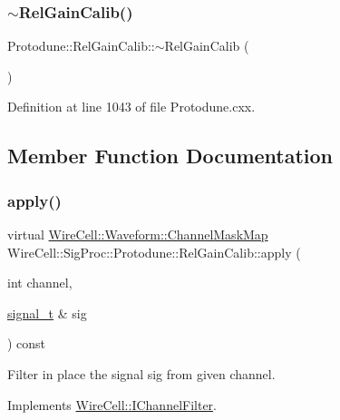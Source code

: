 \subsubsection{\texorpdfstring{$\sim$\+Rel\+Gain\+Calib()}{~RelGainCalib()}}
{\footnotesize\ttfamily Protodune\+::\+Rel\+Gain\+Calib\+::$\sim$\+Rel\+Gain\+Calib (\begin{DoxyParamCaption}{ }\end{DoxyParamCaption})\hspace{0.3cm}{\ttfamily [virtual]}}



Definition at line 1043 of file Protodune.\+cxx.



\subsection{Member Function Documentation}
\mbox{\label{class_wire_cell_1_1_sig_proc_1_1_protodune_1_1_rel_gain_calib_ae841532dd723111810c797fb13e0df3a}} 
\subsubsection{\texorpdfstring{apply()}{apply()}\hspace{0.1cm}{\footnotesize\ttfamily [1/2]}}
{\footnotesize\ttfamily virtual \hyperlink{namespace_wire_cell_1_1_waveform_a18b9ae61c858e340252ba3ac83ac3bc0}{Wire\+Cell\+::\+Waveform\+::\+Channel\+Mask\+Map} Wire\+Cell\+::\+Sig\+Proc\+::\+Protodune\+::\+Rel\+Gain\+Calib\+::apply (\begin{DoxyParamCaption}\item[{int}]{channel,  }\item[{\hyperlink{class_wire_cell_1_1_i_channel_filter_a434ed96cc4b805fa0eeec14f9f8d85e9}{signal\+\_\+t} \&}]{sig }\end{DoxyParamCaption}) const\hspace{0.3cm}{\ttfamily [virtual]}}

Filter in place the signal {\ttfamily sig} from given {\ttfamily channel}. 

Implements \hyperlink{class_wire_cell_1_1_i_channel_filter_a6981186ee38a4b9b66e16c0d9b376b08}{Wire\+Cell\+::\+I\+Channel\+Filter}.

